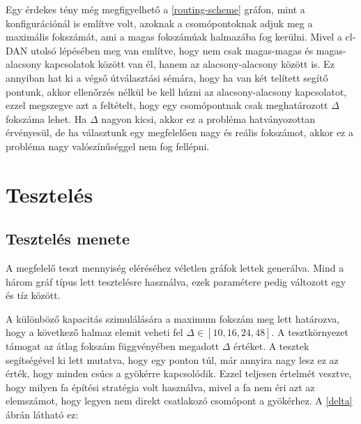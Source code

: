 \documentclass[12pt]{report}
\begin{document}
Egy érdekes tény még megfigyelhető a \ref{routing-scheme} gráfon, mint a konfigurációnál is említve volt, azoknak a csomópontoknak adjuk meg a maximális fokszámát, ami a magas fokszámúak halmazába fog kerülni. 
Mivel a cl-DAN utolsó lépésében meg van említve, hogy nem csak magas-magas és magas-alacsony kapcsolatok között van él, hanem az alacsony-alacsony között is.
Ez annyiban hat ki a végső útválasztási sémára, hogy ha van két telített segítő pontunk, akkor ellenőrzés nélkül be kell húzni az alacsony-alacsony kapcsolatot, ezzel megszegve azt a feltételt, hogy egy csomópontnak csak meghatározott $\Delta$ fokszáma lehet.
Ha $\Delta$ nagyon kicsi, akkor ez a probléma hatványozottan érvényesül, de ha választunk egy megfelelően nagy és reális fokszámot, akkor ez a probléma nagy valószínűséggel nem fog fellépni.
	


\chapter{Tesztelés}


\section{Tesztelés menete}

A megfelelő teszt mennyiség eléréséhez véletlen gráfok lettek generálva. 
Mind a három gráf típus lett tesztelésre használva, ezek paramétere pedig változott egy és tíz között.

A különböző kapacitás szimulálására a maximum fokszám meg lett határozva, hogy a 
következő halmaz elemit veheti fel $\Delta\in[10, 16, 24, 48]$.
A tesztkörnyezet támogat az átlag fokszám függvényében megadott $\Delta$ értéket. 
A tesztek segítségével ki lett mutatva, hogy egy ponton túl, már annyira nagy lesz ez az érték, hogy minden csúcs a gyökérre kapcsolódik.
Ezzel teljesen értelmét vesztve, hogy milyen fa építési stratégia volt használva, mivel a fa nem éri azt az elemszámot, hogy legyen nem direkt csatlakozó csomópont a gyökérhez. 
A \ref{delta} ábrán látható ez:  
\end{document}
